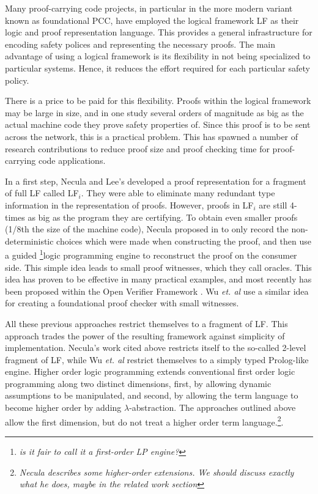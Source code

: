 \documentclass{acmconf}
\newcommand{\ednote}[1]{\footnote{\it #1}}
\begin{document}
Many proof-carrying code projects, in particular in the more modern
variant known as foundational PCC, have employed the logical framework
LF as their logic and proof representation
language\cite{AppelFelty00,Crary:POPL03,AppelFelten99,Crary:CADE03}.
This provides a general infrastructure for encoding safety polices and
representing the necessary proofs.  The main advantage of using a
logical framework is its flexibility in not being specialized to
particular systems.
Hence, it reduces the effort required for
each particular safety policy. 

There is a price to be paid for this flexibility. Proofs within the
logical framework may be large in size, and in one study
several orders of magnitude as big as the actual machine code they
prove safety properties of. Since this proof is to be sent across the
network, this is a practical problem. This has spawned a number of
research contributions to reduce proof size and proof checking time
for proof-carrying code applications.

In a first step, Necula and Lee's \cite{Necula98lics} developed a
proof representation for a fragment of full LF called LF$_i$. They
were able to eliminate many redundant type information in the
representation of proofs. However, proofs in LF$_i$ are still 4-times
as big as the program they are certifying. To obtain even smaller
proofs (1/8th the size of the machine code), Necula proposed in
\cite{Necula+01:oracle} to only record the non-deterministic choices
which were made when constructing the proof, and then use a guided
\ednote{is it fair to call it a first-order LP engine?}logic
programming engine to reconstruct the proof on the consumer side. This
simple idea leads to small proof witnesses, which they call oracles.
This idea has proven to be effective in many practical examples, and
most recently has been proposed within the Open Verifier Framework
\cite{Necula?}. Wu {\em{et. al}} \cite{Appel:PPDP03} use a similar
idea for creating a foundational proof checker with small witnesses.

All these previous approaches restrict themselves to a fragment of LF.
This approach trades the power of the resulting framework against
simplicity of implementation. Necula's work cited above restricts
itself to the so-called 2-level fragment of LF, while Wu {\em et. al}
restrict themselves to a simply typed Prolog-like engine. Higher order
logic programming extends conventional first order logic programming
along two distinct dimensions, first, by allowing dynamic assumptions
to be manipulated, and second, by allowing the term language to become
higher order by adding $\lambda$-abstraction. The approaches outlined
above allow the first dimension, but do not treat a higher order term
language.\ednote{Necula describes some higher-order extensions. We
should discuss exactly what he does, maybe in the related work
section}.
\end{document}
